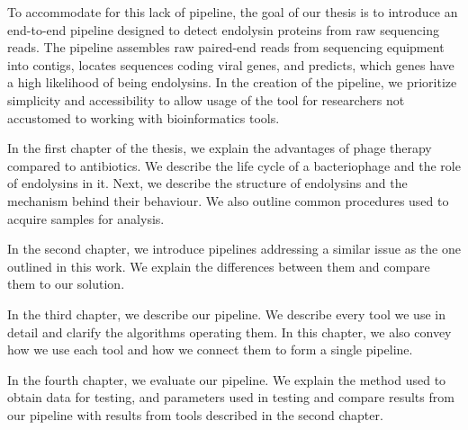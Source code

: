 To accommodate for this lack of pipeline, the goal of our thesis is to introduce an end-to-end pipeline designed to detect endolysin proteins from raw sequencing reads. The pipeline assembles raw paired-end reads from sequencing equipment into contigs, locates sequences coding viral genes, and predicts, which genes have a high likelihood of being endolysins. In the creation of the pipeline, we prioritize simplicity and accessibility to allow usage of the tool for researchers not accustomed to working with bioinformatics tools.

In the first chapter of the thesis, we explain the advantages of phage therapy compared to antibiotics. We describe the life cycle of a bacteriophage and the role of endolysins in it. Next, we describe the structure of endolysins and the mechanism behind their behaviour. We also outline common procedures used to acquire samples for analysis.

In the second chapter, we introduce pipelines addressing a similar issue as the one outlined in this work. We explain the differences between them and compare them to our solution.

In the third chapter, we describe our pipeline. We describe every tool we use in detail and clarify the algorithms operating them. In this chapter, we also convey how we use each tool and how we connect them to form a single pipeline.

In the fourth chapter, we evaluate our pipeline. We explain the method used to obtain data for testing, and parameters used in testing and compare results from our pipeline with results from tools described in the second chapter.